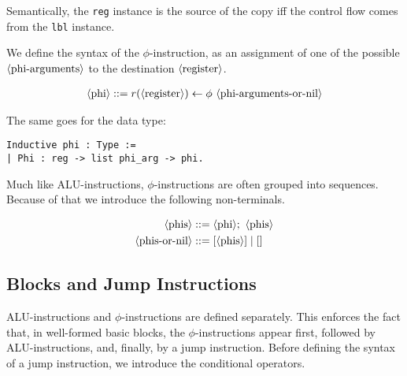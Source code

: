 Semantically, the \texttt{reg} instance is the source of the copy iff the control flow comes from the \texttt{lbl} instance.

We define the syntax of the $\phi$-instruction, as an assignment of one of the possible $\langle\text{phi-arguments}\rangle$ to the destination $\langle\text{register}\rangle$.

\begin{align*}
\nt{phi} ::= r( \nt{register} ) \leftarrow \phi \ \nt{phi-arguments-or-nil}
\end{align*}

The same goes for the data type:

\begin{lstlisting}[style=Rocq]
Inductive phi : Type :=
| Phi : reg -> list phi_arg -> phi.
\end{lstlisting}

Much like ALU-instructions, $\phi$-instructions are often grouped into sequences. Because of that we introduce the following non-terminals.

\begin{align*}
\langle\text{phis}\rangle &::= \langle\text{phi}\rangle ; \ \langle\text{phis}\rangle \\
\langle\text{phis-or-nil}\rangle &::= [ \langle\text{phis}\rangle ] \mid []
\end{align*}


\subsection{Blocks and Jump Instructions}

ALU-instructions and $\phi$-instructions are defined separately. This enforces the fact that, in well-formed basic blocks, the $\phi$-instructions appear first, followed by ALU-instructions, and, finally, by a jump instruction.
Before defining the syntax of a jump instruction, we introduce the conditional operators.

